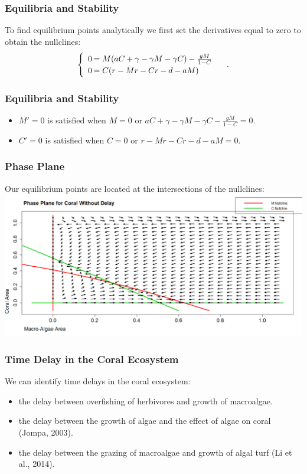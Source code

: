 \begin{frame}\frametitle{Equilibria and Stability}
To find equilibrium points analytically we first set the derivatives equal to zero to obtain the nullclines:
$$\begin{cases}
\begin{array}{rl}
0\hspace{-.8em}&=M(aC + \gamma-\gamma M-\gamma C) - \frac{gM}{1-C}\\
0\hspace{-.8em}&=C(r-Mr-Cr - d - aM)\\
\end{array}
\end{cases}.$$
\end{frame}

\begin{frame}\frametitle{Equilibria and Stability}\begin{itemize}
\item $M'=0$ is satisfied when $M=0$ or $aC + \gamma - \gamma M - \gamma C - \frac{gM}{1-C}=0$.
\item $C'=0$ is satisfied when $C=0$ or $r-Mr-Cr-d-aM=0$.
\end{itemize}
\end{frame}

\begin{frame}\frametitle{Phase Plane} Our equilibrium points are located at the intersections of the nullclines:
\includegraphics[scale=.22]{./nullclines.png}
\end{frame}

\begin{frame}
\frametitle{Time Delay in the Coral Ecosystem}
We can identify time delays in the coral ecosystem:
\begin{itemize}
\item the delay between overfishing of herbivores and growth of macroalgae.\\
\item the delay between the growth of algae and the effect of algae on coral (Jompa, 2003).\\
\item the delay between the grazing of macroalgae and growth of algal turf (Li et al., 2014).
\end{itemize}
\end{frame}

